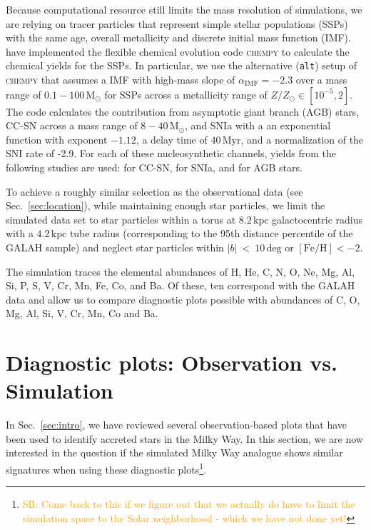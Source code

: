 \documentclass[fleqn,usenatbib]{mnras}
\newcommand{\SB}[1]{{\textcolor{orange}{SB: #1}}}
\begin{document}
Because computational resource still limits the mass resolution of simulations, we are relying on tracer particles that represent simple stellar populations (SSPs) with the same age, overall metallicity and discrete initial mass function (IMF). \citet{Buck2021} have implemented the flexible chemical evolution code \textsc{chempy} \citep{Rybizki2017} to calculate the chemical yields for the SSPs. In particular, we use the alternative (\texttt{alt}) setup of \textsc{chempy} that assumes a \citet{Chabrier2003} IMF with high-mass slope of $\alpha_\text{IMF} = -2.3$ over a mass range of $0.1-100\,\mathrm{M_\odot}$ for SSPs across a metallicity range of $Z/Z_\odot \in [10^{-5},2]$. The code calculates the contribution from asymptotic giant branch (AGB) stars, CC-SN across a mass range of $8-40\,\mathrm{M_\odot}$, and SNIa with a an exponential function with exponent $-1.12$, a delay time of $40\,\mathrm{Myr}$, and a normalization of the SNI rate of -2.9. For each of these nucleosynthetic channels, yields from the following studies are used: \citet{Limongi2018} for CC-SN, \citet{Seitenzahl2013} for SNIa, and \citet{Karakas2016} for AGB stars.

To achieve a roughly similar selection as the observational data (see Sec.~\ref{sec:location}), while maintaining enough star particles, we limit the simulated data set to star particles within a torus at $8.2\,\mathrm{kpc}$ galactocentric radius with a $4.2\,\mathrm{kpc}$ tube radius (corresponding to the 95th distance percentile of the GALAH sample) and neglect star particles within $\vert b \vert~<~10\,\mathrm{deg}$ or $\mathrm{[Fe/H]} < -2$.

The simulation traces the elemental abundances of H, He, C, N, O, Ne, Mg, Al, Si, P, S, V, Cr, Mn, Fe, Co, and Ba. Of these, ten correspond with the GALAH data and allow us to compare diagnostic plots possible with abundances of C, O, Mg, Al, Si, V, Cr, Mn, Co and Ba.


\section{Diagnostic plots: Observation vs. Simulation}
\label{sec:comparison}

In Sec.~\ref{sec:intro}, we have reviewed several observation-based plots that have been used to identify accreted stars in the Milky Way. In this section, we are now interested in the question if the simulated Milky Way analogue shows similar signatures when using these diagnostic plots\footnote{\SB{Come back to this if we figure out that we actually do have to limit the simulation space to the Solar neighborhood - which we have not done yet!}}.
\end{document}
